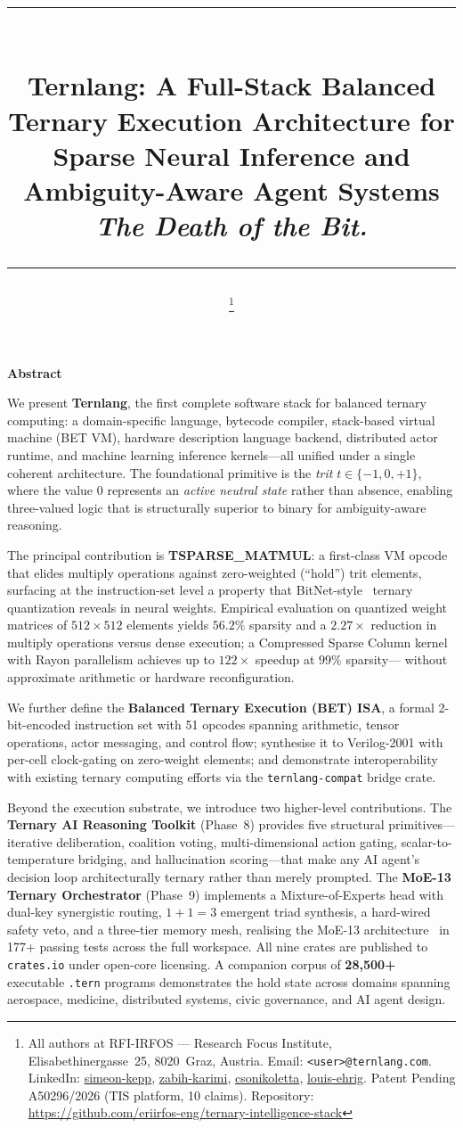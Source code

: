 \documentclass[11pt,a4paper]{article}
\title{{\normalcolor\rule{\linewidth}{2.5pt}}\\[7pt]
       Ternlang: A Full-Stack Balanced Ternary Execution Architecture
       for Sparse Neural Inference and Ambiguity-Aware Agent Systems\\[3pt]
       {\normalfont\normalsize\itshape The Death of the Bit.}\\[6pt]
       {\normalcolor\rule{\linewidth}{0.6pt}}}
\author{%
\IEEEauthorblockN{%
\renewcommand{\arraystretch}{1.2}%
\fit{\begin{tabular}{@{}c@{\hspace{1.6em}}c@{\hspace{1.6em}}c@{\hspace{1.6em}}c@{}}
\textbf{Simeon Kepp} & \textbf{Zabih Karimi} & \textbf{Nikoletta Csonka} & \textbf{Louis Paul Ehrig}\\
{\footnotesize Lead Architect} & {\footnotesize IT \& Network Eng.} & {\footnotesize Intl.\ Relations} & {\footnotesize Public Affairs}\\
{\scriptsize\href{mailto:s.kepp@ternlang.com}{\texttt{s.kepp}}} & {\scriptsize\href{mailto:z.karimi@ternlang.com}{\texttt{z.karimi}}} & {\scriptsize\href{mailto:csonikoletta@ternlang.com}{\texttt{csonikoletta}}} & {\scriptsize\href{mailto:l.ehrig@ternlang.com}{\texttt{l.ehrig}}}\\
\end{tabular}}}
\thanks{All authors at RFI-IRFOS --- Research Focus Institute, Elisabethinergasse~25, 8020~Graz, Austria. Email: \texttt{<user>@ternlang.com}. LinkedIn: \href{https://www.linkedin.com/in/simeon-kepp}{simeon-kepp}, \href{https://www.linkedin.com/in/zabih-karimi}{zabih-karimi}, \href{https://www.linkedin.com/in/csonikoletta}{csonikoletta}, \href{https://www.linkedin.com/in/louis-ehrig}{louis-ehrig}. Patent Pending A50296/2026 (TIS platform, 10 claims). Repository: \url{https://github.com/eriirfos-eng/ternary-intelligence-stack}}%
}
\renewenvironment{abstract}{%
  \par\medskip
  {\centering\bfseries Abstract\par}\nopagebreak\smallskip
  \list{}{%
    \setlength{\leftmargin}{0.085\linewidth}%
    \setlength{\rightmargin}{0.085\linewidth}%
    \setlength{\parsep}{0.4em}%
    \setlength{\topsep}{0pt}}%
  \item\relax\small}%
  {\endlist\par\medskip}
\begin{document}
\maketitle

\begin{abstract}
We present \textbf{Ternlang}, the first complete software stack for
balanced ternary computing: a domain-specific language, bytecode compiler,
stack-based virtual machine (BET VM), hardware description language backend,
distributed actor runtime, and machine learning inference kernels—all unified
under a single coherent architecture. The foundational primitive is the
\emph{trit} $t \in \{-1, 0, +1\}$, where the value $0$ represents an
\emph{active neutral state} rather than absence, enabling three-valued logic
that is structurally superior to binary for ambiguity-aware reasoning.

The principal contribution is \textbf{TSPARSE\_MATMUL}: a first-class VM
opcode that elides multiply operations against zero-weighted (``hold'') trit
elements, surfacing at the instruction-set level a property that
BitNet-style~\cite{ma2024era} ternary quantization reveals in neural weights.
Empirical evaluation on quantized weight matrices of $512 \times 512$
elements yields $56.2\%$ sparsity and a $2.27\times$ reduction in multiply
operations versus dense execution; a Compressed Sparse Column kernel with
Rayon parallelism achieves up to $122\times$ speedup at $99\%$ sparsity—
without approximate arithmetic or hardware reconfiguration.

We further define the \textbf{Balanced Ternary Execution (BET) ISA}, a
formal 2-bit-encoded instruction set with 51 opcodes spanning arithmetic,
tensor operations, actor messaging, and control flow; synthesise it to
Verilog-2001 with per-cell clock-gating on zero-weight elements; and
demonstrate interoperability with existing ternary computing efforts via the
\texttt{ternlang-compat} bridge crate.

Beyond the execution substrate, we introduce two higher-level contributions.
The \textbf{Ternary AI Reasoning Toolkit} (Phase~8) provides five structural
primitives—iterative deliberation, coalition voting, multi-dimensional action
gating, scalar-to-temperature bridging, and hallucination scoring—that make
any AI agent's decision loop architecturally ternary rather than merely
prompted. The \textbf{MoE-13 Ternary Orchestrator} (Phase~9) implements a
Mixture-of-Experts head with dual-key synergistic routing, $1{+}1{=}3$
emergent triad synthesis, a hard-wired safety veto, and a three-tier memory
mesh, realising the MoE-13 architecture~\cite{moe13_2026} in 177+ passing
tests across the full workspace. All nine crates are published to
\texttt{crates.io} under open-core licensing. A companion corpus of
\textbf{28,500+} executable \texttt{.tern} programs demonstrates the hold state
across domains spanning aerospace, medicine, distributed systems, civic
governance, and AI agent design.


\end{abstract}
\end{document}
